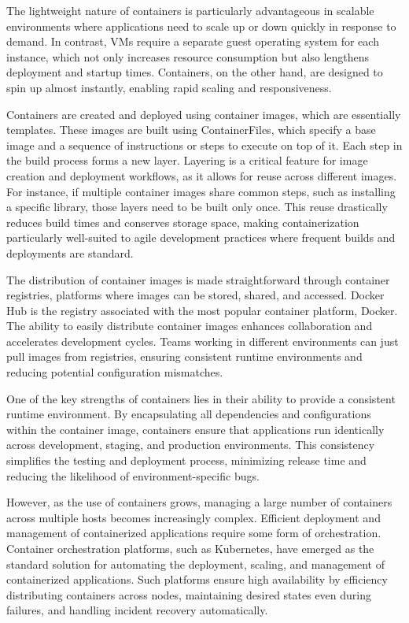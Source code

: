 The lightweight nature of containers is particularly advantageous in scalable environments where applications need to scale up or down quickly in response to demand. In contrast, VMs require a separate guest operating system for each instance, which not only increases resource consumption but also lengthens deployment and startup times. Containers, on the other hand, are designed to spin up almost instantly, enabling rapid scaling and responsiveness.

Containers are created and deployed using container images, which are essentially templates. These images are built using ContainerFiles, which specify a base image and a sequence of instructions or steps to execute on top of it. Each step in the build process forms a new layer. Layering is a critical feature for image creation and deployment workflows, as it allows for reuse across different images. For instance, if multiple container images share common steps, such as installing a specific library, those layers need to be built only once. This reuse drastically reduces build times and conserves storage space, making containerization particularly well-suited to agile development practices where frequent builds and deployments are standard.

The distribution of container images is made straightforward through container registries, platforms where images can be stored, shared, and accessed. Docker Hub is the registry associated with the most popular container platform, Docker. The ability to easily distribute container images enhances collaboration and accelerates development cycles. Teams working in different environments can just pull images from registries, ensuring consistent runtime environments and reducing potential configuration mismatches.

One of the key strengths of containers lies in their ability to provide a consistent runtime environment. By encapsulating all dependencies and configurations within the container image, containers ensure that applications run identically across development, staging, and production environments. This consistency simplifies the testing and deployment process, minimizing release time and reducing the likelihood of environment-specific bugs.

However, as the use of containers grows, managing a large number of containers across multiple hosts becomes increasingly complex. Efficient deployment and management of containerized applications require some form of orchestration. Container orchestration platforms, such as Kubernetes, have emerged as the standard solution for automating the deployment, scaling, and management of containerized applications\cite{dockerDev}. Such platforms ensure high availability by efficiency distributing containers across nodes, maintaining desired states even during failures, and handling incident recovery automatically.

